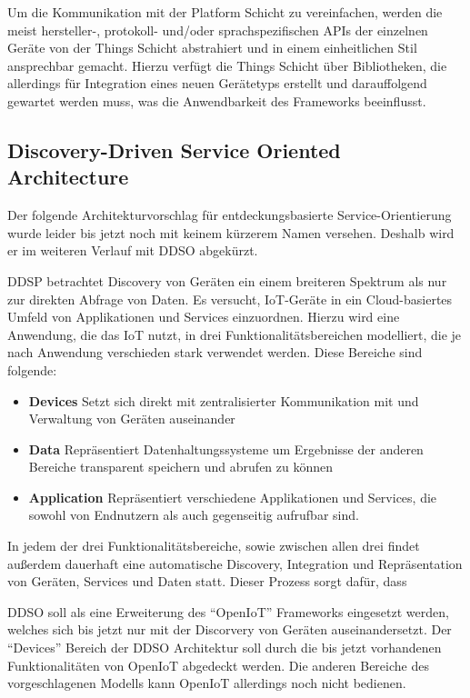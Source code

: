 \documentclass[conference,compsoc]{IEEEtran}
\begin{document}
Um die Kommunikation mit der Platform Schicht zu vereinfachen, werden die meist hersteller-, protokoll- und/oder sprachspezifischen APIs der einzelnen Geräte von der Things Schicht abstrahiert und in einem einheitlichen Stil ansprechbar gemacht. Hierzu verfügt die Things Schicht über Bibliotheken, die allerdings für Integration eines neuen Gerätetyps erstellt und darauffolgend gewartet werden muss, was die Anwendbarkeit des Frameworks beeinflusst.

\subsection{Discovery-Driven Service Oriented Architecture}
Der folgende Architekturvorschlag für entdeckungsbasierte Service-Orientierung wurde leider bis jetzt noch mit keinem kürzerem Namen versehen. Deshalb wird er im weiteren Verlauf mit DDSO abgekürzt.

DDSP betrachtet Discovery von Geräten ein einem breiteren Spektrum als nur zur direkten Abfrage von Daten. Es versucht, IoT-Geräte in ein Cloud-basiertes Umfeld von Applikationen und Services einzuordnen. Hierzu wird eine Anwendung, die das IoT nutzt, in drei Funktionalitätsbereichen modelliert, die je nach Anwendung verschieden stark verwendet werden. Diese Bereiche sind folgende:

\begin{itemize}
\item \textbf{Devices} Setzt sich direkt mit zentralisierter Kommunikation mit und  Verwaltung von Geräten auseinander
\item \textbf{Data} Repräsentiert Datenhaltungssysteme um Ergebnisse der anderen Bereiche transparent speichern und abrufen zu können
\item \textbf{Application} Repräsentiert verschiedene Applikationen und Services, die sowohl von Endnutzern als auch gegenseitig aufrufbar sind.
\end{itemize}

In jedem der drei Funktionalitätsbereiche, sowie zwischen allen drei findet außerdem dauerhaft eine automatische Discovery, Integration und Repräsentation von Geräten, Services und Daten statt. Dieser Prozess sorgt dafür, dass 

DDSO soll als eine Erweiterung des \enquote{OpenIoT} Frameworks eingesetzt werden, welches sich bis jetzt nur mit der Discorvery von Geräten auseinandersetzt. Der \enquote{Devices} Bereich der DDSO Architektur soll durch die bis jetzt vorhandenen Funktionalitäten von OpenIoT abgedeckt werden. Die anderen Bereiche des vorgeschlagenen Modells kann OpenIoT allerdings noch nicht bedienen.
\end{document}
